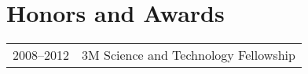 \section*{Honors and Awards}
\begin{tabular}{L!{\VRule}R}
2008--2012&3M Science and Technology Fellowship\\
\end{tabular}